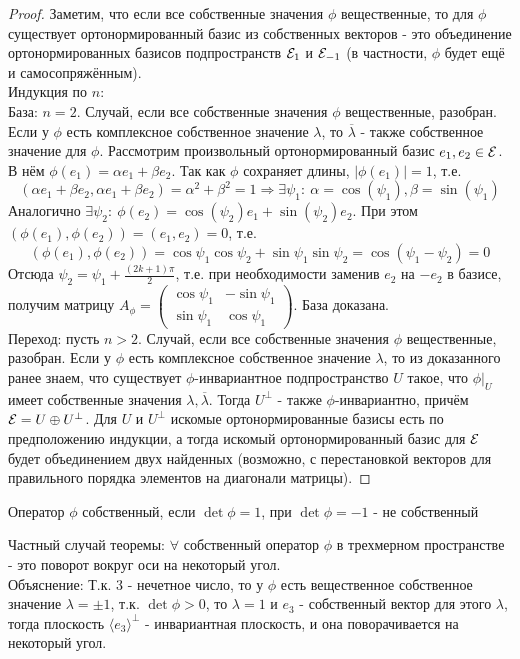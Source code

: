 \begin{proof}
    Заметим, что если все собственные значения $\phi$ вещественные, то для $\phi$ существует ортонормированный базис из собственных векторов - это объединение ортонормированных базисов подпространств $\mathcal{E}_{1}$ и $\mathcal{E}_{-1}$ (в частности, $\phi$ будет ещё и самосопряжённым).\\
    Индукция по $n$:\\
    База: $n = 2$. Случай, если все собственные значения $\phi$ вещественные, разобран. Если у $\phi$ есть комплексное собственное значение $\lambda$, то $\overline{\lambda}$ - также собственное значение для $\phi$. Рассмотрим произвольный ортонормированный базис $e_1, e_2 \in \mathcal{E}$. В нём $\phi(e_1) = \alpha e_1 + \beta e_2$. Так как $\phi$ сохраняет длины, $|\phi(e_1)| = 1$, т.е.
    \[(\alpha e_1 + \beta e_2, \alpha e_1 + \beta e_2) = \alpha^2 + \beta^2 = 1 \Longrightarrow \exists \psi_1: \ \alpha = \cos(\psi_1), \beta = \sin(\psi_1)\]
    Аналогично $\exists \psi_2: \ \phi(e_2) = \cos(\psi_2)e_1 + \sin(\psi_2)e_2$. При этом $(\phi(e_1), \phi(e_2)) = (e_1, e_2) = 0$, т.е.
    \[(\phi(e_1), \phi(e_2)) = \cos\psi_1\cos\psi_2 + \sin\psi_1\sin\psi_2 = \cos(\psi_1 - \psi_2) = 0\] 
    Отсюда $\psi_2 = \psi_1 + \frac{(2k+1)\pi}{2}$, т.е. при необходимости заменив $e_2$ на $-e_2$ в базисе, получим матрицу $A_\phi = \begin{pmatrix} \cos\psi_1 & -\sin\psi_1 \\ \sin\psi_1 & \cos\psi_1 \end{pmatrix}$. База доказана.\\
    Переход: пусть $n > 2$. Случай, если все собственные значения $\phi$ вещественные, разобран. Если у $\phi$ есть комплексное собственное значение $\lambda$, то из доказанного ранее знаем, что существует $\phi$-инвариантное подпространство $U$ такое, что $\phi|_{U}$ имеет собственные значения $\lambda, \overline{\lambda}$. Тогда $U^\perp$ - также $\phi$-инвариантно, причём $\mathcal{E} = U \oplus U^\perp$. Для $U$ и $U^\perp$ искомые ортонормированные базисы есть по предположению индукции, а тогда искомый ортонормированный базис для $\mathcal{E}$ будет объединением двух найденных (возможно, с перестановкой векторов для правильного порядка элементов на диагонали матрицы).      
\end{proof} 
\begin{definition}
    Оператор $\phi$ собственный, если $\det \phi = 1$, при $\det \phi = -1$ -  не собственный  
\end{definition}
Частный случай теоремы: $\forall$ собственный оператор $\phi$ в трехмерном пространстве - это поворот вокруг оси на некоторый угол.\\
Объяснение: Т.к. 3 - нечетное число, то у $\phi$ есть вещественное собственное значение $\lambda=\pm 1$, т.к. $\det \phi > 0$, то $\lambda=1$ и $e_3$ - собственный вектор для этого $\lambda$, тогда плоскость $\langle e_3 \rangle^{\bot}$ - инвариантная плоскость, и она поворачивается на некоторый угол.
 
 